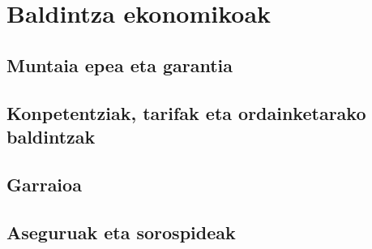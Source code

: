 %

\section{Baldintza ekonomikoak}

\subsection{Muntaia epea eta garantia}

\subsection{Konpetentziak, tarifak eta ordainketarako baldintzak}

\subsection{Garraioa}

\subsection{Aseguruak eta sorospideak}
